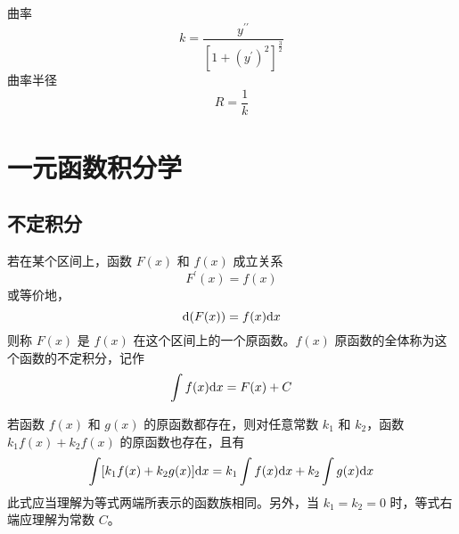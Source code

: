 \documentclass{ctexbook}
\def\diff{\textnormal{d}}
\begin{document}
\begin{definition}[曲率半径]
    曲率 
    \begin{equation}
        k=\frac{y^{\prime\prime}}{\left[1+(y^\prime)^2\right]^{\frac{3}{2}}}        
    \end{equation}
    曲率半径
    \begin{equation}
        R = \frac{1}{k}
    \end{equation}
\end{definition}

\chapter{一元函数积分学}

\section{不定积分}

\begin{definition}[不定积分]
    若在某个区间上，函数 $F(x)$ 和 $f(x)$ 成立关系
    \begin{equation}
        F^\prime(x)=f(x)
    \end{equation}
    或等价地，
    \begin{equation}
        \diff(F(x))=f(x)\diff x
    \end{equation}
    则称 $F(x)$ 是 $f(x)$ 在这个区间上的一个原函数。$f(x)$ 原函数的全体称为这个函数的不定积分，记作
    \begin{equation}
        \int f(x)\diff x = F(x) + C
    \end{equation}
\end{definition}

\begin{theorem}[不定积分的线性性]
    若函数 $f(x)$ 和 $g(x)$ 的原函数都存在，则对任意常数 $k_1$ 和 $k_2$，函数 $k_1f(x)+k_2f(x)$ 的原函数也存在，且有
    \begin{equation}
        \int [k_1f(x)+k_2g(x)]\diff x=k_1\int f(x)\diff x+k_2\int g(x)\diff x
    \end{equation}
    此式应当理解为等式两端所表示的函数族相同。另外，当 $k_1=k_2=0$ 时，等式右端应理解为常数 $C$。
\end{theorem}
\end{document}
